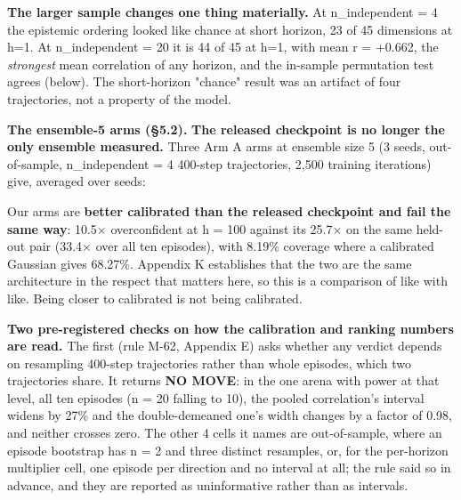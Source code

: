 \documentclass[10pt]{article}
\begin{document}
\textbf{The larger sample changes one thing materially.} At n\_independent = 4 the epistemic ordering looked like chance at short horizon, 23 of 45 dimensions at h=1. At n\_independent = 20 it is 44 of 45 at h=1, with mean r = +0.662, the \emph{strongest} mean correlation of any horizon, and the in-sample permutation test agrees (below). The short-horizon "chance" result was an artifact of four trajectories, not a property of the model.

\textbf{The ensemble-5 arms (\S{}5.2).} \textbf{The released checkpoint is no longer the only ensemble measured.} Three Arm A arms at ensemble size 5 (3 seeds, out-of-sample, n\_independent = 4 400-step trajectories, 2,500 training iterations) give, averaged over seeds:

\begin{center}\small{}\end{center}

Our arms are \textbf{better calibrated than the released checkpoint and fail the same way}: 10.5$\times$ overconfident at h = 100 against its 25.7$\times$ on the same held-out pair (33.4$\times$ over all ten episodes), with 8.19\% coverage where a calibrated Gaussian gives 68.27\%. Appendix K establishes that the two are the same architecture in the respect that matters here, so this is a comparison of like with like. Being closer to calibrated is not being calibrated.

\textbf{Two pre-registered checks on how the calibration and ranking numbers are read.} The first (rule M-62, Appendix E) asks whether any verdict depends on resampling 400-step trajectories rather than whole episodes, which two trajectories share. It returns \textbf{NO MOVE}: in the one arena with power at that level, all ten episodes (n = 20 falling to 10), the pooled correlation's interval widens by 27\% and the double-demeaned one's width changes by a factor of 0.98, and neither crosses zero. The other 4 cells it names are out-of-sample, where an episode bootstrap has n = 2 and three distinct resamples, or, for the per-horizon multiplier cell, one episode per direction and no interval at all; the rule said so in advance, and they are reported as uninformative rather than as intervals.
\end{document}
